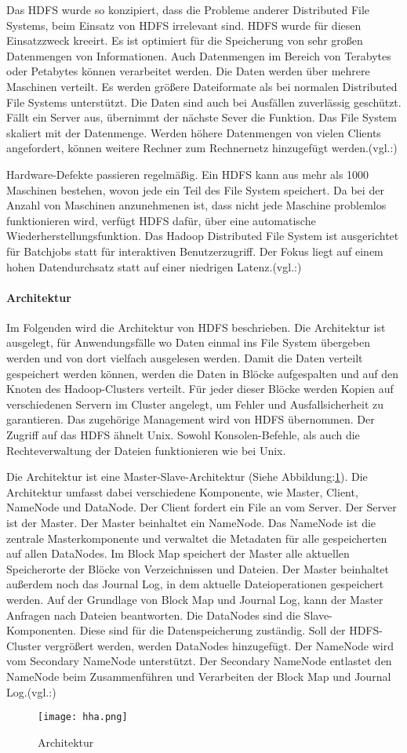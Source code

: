 Das HDFS wurde so konzipiert, dass die Probleme anderer Distributed File Systems, beim Einsatz von HDFS irrelevant sind. HDFS wurde für diesen Einsatzzweck kreeirt. Es ist optimiert für die Speicherung von sehr großen Datenmengen von Informationen. Auch Datenmengen im Bereich von Terabytes oder Petabytes können verarbeitet werden. Die Daten werden über mehrere Maschinen verteilt. Es werden größere Dateiformate als bei normalen Distributed File Systems unterstützt. Die Daten sind auch bei Ausfällen zuverlässig geschützt. Fällt ein Server aus, übernimmt der nächste Sever die Funktion. Das File System skaliert mit der Datenmenge. Werden höhere Datenmengen von vielen Clients angefordert, können weitere Rechner zum Rechnernetz hinzugefügt werden.(vgl.:\cite{yahoo})

Hardware-Defekte passieren regelmäßig. Ein HDFS kann aus mehr als 1000 Maschinen bestehen, wovon jede ein Teil des File System speichert. Da bei der Anzahl von Maschinen anzunehmenen ist, dass nicht jede Maschine problemlos funktionieren wird, verfügt HDFS dafür, über eine automatische Wiederherstellungsfunktion. Das Hadoop Distributed File System ist ausgerichtet für Batchjobs statt für interaktiven Benutzerzugriff. Der Fokus liegt auf einem hohen Datendurchsatz statt auf einer niedrigen Latenz.(vgl.:\cite{archguid})
 
\paragraph{Architektur}
Im Folgenden wird die Architektur von HDFS beschrieben. Die Architektur ist ausgelegt, für Anwendungsfälle wo Daten einmal ins File System übergeben werden und von dort vielfach ausgelesen werden. Damit die Daten verteilt gespeichert werden können, werden die Daten in Blöcke aufgespalten und auf den Knoten des Hadoop-Clusters verteilt. Für jeder dieser Blöcke werden Kopien auf verschiedenen Servern im Cluster angelegt, um Fehler und Ausfallsicherheit zu garantieren. Das zugehörige Management wird von HDFS übernommen. Der Zugriff auf das HDFS ähnelt Unix. Sowohl Konsolen-Befehle, als auch die Rechteverwaltung der Dateien funktionieren wie bei Unix. 

Die Architektur ist eine Master-Slave-Architektur (Siehe Abbildung:\ref{fig:Architektur}). Die Architektur umfasst dabei verschiedene Komponente, wie Master, Client, NameNode und DataNode. Der Client fordert ein File an vom Server. Der Server ist der Master. Der Master beinhaltet ein NameNode. Das NameNode ist die zentrale Masterkomponente und verwaltet die Metadaten für alle gespeicherten auf allen DataNodes. Im Block Map speichert der Master alle aktuellen Speicherorte der Blöcke von Verzeichnissen und Dateien. Der Master beinhaltet außerdem noch das Journal Log, in dem aktuelle Dateioperationen gespeichert werden. Auf der Grundlage von Block Map und Journal Log, kann der Master Anfragen nach Dateien beantworten. Die DataNodes sind die Slave-Komponenten. Diese sind für die Datenspeicherung zuständig. Soll der HDFS-Cluster vergrößert werden, werden DataNodes hinzugefügt. Der NameNode wird vom Secondary NameNode unterstützt. Der Secondary NameNode entlastet den NameNode beim Zusammenführen und Verarbeiten der Block Map und Journal Log.(vgl.:\cite{uwe})

\begin{figure}[h!]
    \centering
    \texttt{[image: hha.png]}
    \caption{Architektur\cite{uwes}}
    \label{fig:Architektur}
  \end{figure}

  

